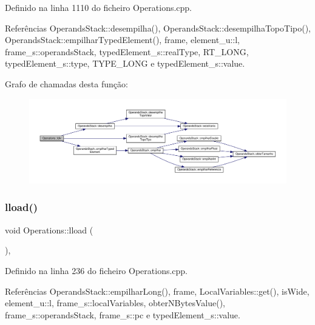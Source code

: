 Definido na linha 1110 do ficheiro Operations.\+cpp.



Referências Operands\+Stack\+::desempilha(), Operands\+Stack\+::desempilha\+Topo\+Tipo(), Operands\+Stack\+::empilhar\+Typed\+Element(), frame, element\+\_\+u\+::l, frame\+\_\+s\+::operands\+Stack, typed\+Element\+\_\+s\+::real\+Type, R\+T\+\_\+\+L\+O\+NG, typed\+Element\+\_\+s\+::type, T\+Y\+P\+E\+\_\+\+L\+O\+NG e typed\+Element\+\_\+s\+::value.

Grafo de chamadas desta função\+:
\nopagebreak
\begin{figure}[H]
\begin{center}
\leavevmode
\includegraphics[width=350pt]{classOperations_ab9bb90a9db0433e1d04b0eb9bceea9f4_cgraph}
\end{center}
\end{figure}
\mbox{\label{classOperations_abd9d44b782cc5ae7d7985a424a0985c6}} 
\subsubsection{\texorpdfstring{lload()}{lload()}}
{\footnotesize\ttfamily void Operations\+::lload (\begin{DoxyParamCaption}{ }\end{DoxyParamCaption})\hspace{0.3cm}{\ttfamily [static]}, {\ttfamily [private]}}



Definido na linha 236 do ficheiro Operations.\+cpp.



Referências Operands\+Stack\+::empilhar\+Long(), frame, Local\+Variables\+::get(), is\+Wide, element\+\_\+u\+::l, frame\+\_\+s\+::local\+Variables, obter\+N\+Bytes\+Value(), frame\+\_\+s\+::operands\+Stack, frame\+\_\+s\+::pc e typed\+Element\+\_\+s\+::value.

